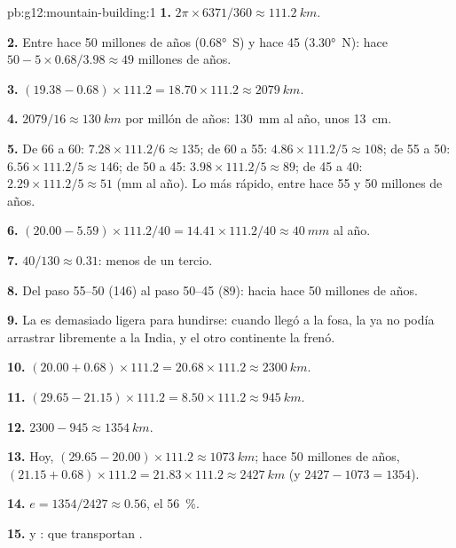 \begin{solution}{pb:g12:mountain-building:1}
\textbf{1.} $2\pi \times 6371/360 \approx \qty{111.2}{km}$.

\textbf{2.} Entre hace 50 millones de años (\ang{0.68}~S) y hace 45 (\ang{3.30}~N):
hace $50 - 5 \times 0.68/3.98 \approx 49$ millones de años.

\textbf{3.} $(19.38 - 0.68) \times 111.2 = 18.70 \times 111.2 \approx
\qty{2079}{km}$.

\textbf{4.} $2079/16 \approx \qty{130}{km}$ por millón de años: \qty{130}{mm}
al año, unos \qty{13}{cm}.

\textbf{5.} De 66 a 60: $7.28 \times 111.2/6 \approx 135$; de 60 a 55: $4.86
\times 111.2/5 \approx 108$; de 55 a 50: $6.56 \times 111.2/5 \approx 146$; de 50
a 45: $3.98 \times 111.2/5 \approx 89$; de 45 a 40: $2.29 \times 111.2/5
\approx 51$ (\unit{mm} al año). Lo más rápido, entre hace 55 y 50 millones de años.

\textbf{6.} $(20.00 - 5.59) \times 111.2/40 = 14.41 \times 111.2/40 \approx
\qty{40}{mm}$ al año.

\textbf{7.} $40/130 \approx 0.31$: menos de un tercio.

\textbf{8.} Del paso 55--50 (146) al paso 50--45 (89): hacia hace 50
millones de años.

\textbf{9.} La  es demasiado ligera para hundirse: cuando
llegó a la fosa, la  ya no podía arrastrar libremente a la India, y
el otro continente la frenó.

\textbf{10.} $(20.00 + 0.68) \times 111.2 = 20.68 \times 111.2 \approx
\qty{2300}{km}$.

\textbf{11.} $(29.65 - 21.15) \times 111.2 = 8.50 \times 111.2 \approx
\qty{945}{km}$.

\textbf{12.} $2300 - 945 \approx \qty{1354}{km}$.

\textbf{13.} Hoy, $(29.65 - 20.00) \times 111.2 \approx \qty{1073}{km}$;
hace 50 millones de años, $(21.15 + 0.68) \times 111.2 = 21.83 \times 111.2
\approx \qty{2427}{km}$ (y $2427 - 1073 = 1354$).

\textbf{14.} $e = 1354/2427 \approx 0.56$, el \qty{56}{\percent}.

\textbf{15.}  y :  que transportan .


\end{solution}
